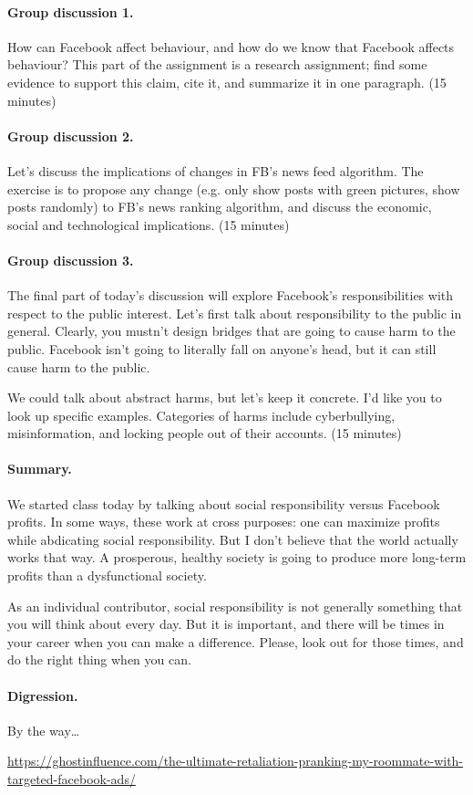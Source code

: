 \documentclass[11pt]{article}
\begin{document}
\paragraph{Group discussion 1.} How can Facebook affect behaviour, and
how do we know that Facebook affects behaviour? This part of the
assignment is a research assignment; find some evidence to support
this claim, cite it, and summarize it in one paragraph. (15 minutes)

\paragraph{Group discussion 2.} Let's discuss the implications of changes in FB's news feed
algorithm.  The exercise is to propose any change (e.g. only show
posts with green pictures, show posts randomly) to FB's news ranking
algorithm, and discuss the economic, social and technological
implications. (15 minutes)

\paragraph{Group discussion 3.} The final part of today's discussion will explore Facebook's
responsibilities with respect to the public interest. Let's first
talk about responsibility to the public in general. Clearly, 
you mustn't design bridges that are going to cause harm to the public.
Facebook isn't going to literally fall on anyone's head, but it can
still cause harm to the public.

We could talk about abstract harms, but let's keep it concrete. I'd like
you to look up specific examples. Categories of harms include cyberbullying,
misinformation, and locking people out of their accounts. (15 minutes)

\paragraph{Summary.}
We started class today by talking about social responsibility versus Facebook
profits. In some ways, these work at cross purposes: one can maximize profits while 
abdicating social responsibility. But I don't believe that the world actually works
that way. A prosperous, healthy society is going to produce more long-term profits
than a dysfunctional society. 

As an individual contributor, social responsibility is not generally something
that you will think about every day. But it is important, and there will be times
in your career when you can make a difference. Please, look out for those times,
and do the right thing when you can.

\paragraph{Digression.} By the way\ldots

\scriptsize
\begin{center}
\url{https://ghostinfluence.com/the-ultimate-retaliation-pranking-my-roommate-with-targeted-facebook-ads/}
\end{center}
\end{document}
